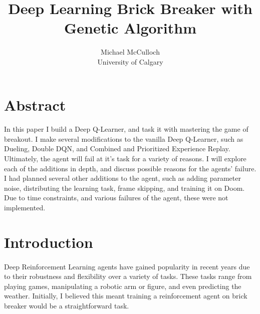 \documentclass[letterpaper,twocolumn,10pt]{article}
\begin{document}
    
    \date{}
    
    \title{\Large \bf Deep Learning Brick Breaker with Genetic Algorithm}
    
    \author{Michael McCulloch \\ University of Calgary}
    
    \maketitle
    
    \thispagestyle{empty}

    \section{Abstract}
    \paragraph{}In this paper I build a Deep Q-Learner, and task it with mastering the game of breakout. I make several modifications to the vanilla Deep Q-Learner, such as Dueling, Double DQN, and Combined and Prioritized Experience Replay. Ultimately, the agent will fail at it's task for a variety of reasons. I will explore each of the additions in depth, and discuss possible reasons for the agents' failure. I had planned several other additions to the agent, such as adding parameter noise, distributing the learning task, frame skipping, and training it on Doom. Due to time constraints, and various failures of the agent, these were not implemented.

    \section{Introduction}
    \paragraph{}Deep Reinforcement Learning agents have gained popularity in recent years due to their robustness and flexibility over a variety of tasks. These tasks range from playing games, manipulating a robotic arm or figure, and even predicting the weather. Initially, I believed this meant training a reinforcement agent on brick breaker would be a straightforward task. 
\end{document}
